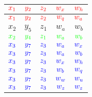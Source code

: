 \documentclass{article}
\begin{document}
{\begin{flushright}
\begin{tabular}{lllll}
	\multicolumn{1}{|c|}{$\textcolor{myred}{x_1}$} & \multicolumn{1}{c|}{$\textcolor{myred}{y_2}$} & \multicolumn{1}{c|}{$\textcolor{myred}{z_2}$} & \multicolumn{1}{c|}{$\textcolor{myred}{w_x}$} & \multicolumn{1}{c|}{$\textcolor{myred}{w_h}$}\\ \hline
    \multicolumn{1}{|c|}{$\textcolor{myred}{x_1}$} & \multicolumn{1}{c|}{$\textcolor{myred}{y_2}$} & \multicolumn{1}{c|}{$\textcolor{myred}{z_2}$} & \multicolumn{1}{c|}{$\textcolor{myred}{w_q}$} & \multicolumn{1}{c|}{$\textcolor{myred}{w_a}$}\\ \hline
    \multicolumn{1}{|c|}{$x_2$} & \multicolumn{1}{c|}{$y_5$} & \multicolumn{1}{c|}{$z_1$} & \multicolumn{1}{c|}{$w_a$} & \multicolumn{1}{c|}{$w_b$}\\ \hline
	\multicolumn{1}{|c|}{$\textcolor{mygreen}{x_2}$} & \multicolumn{1}{c|}{$\textcolor{mygreen}{y_4}$} & \multicolumn{1}{c|}{$\textcolor{mygreen}{z_1}$} & \multicolumn{1}{c|}{$\textcolor{mygreen}{w_a}$} & \multicolumn{1}{c|}{$\textcolor{mygreen}{w_b}$}\\ \hline
    \multicolumn{1}{|c|}{$\textcolor{myblue}{x_3}$} & \multicolumn{1}{c|}{$\textcolor{myblue}{y_7}$} & \multicolumn{1}{c|}{$\textcolor{myblue}{z_3}$} & \multicolumn{1}{c|}{$\textcolor{myblue}{w_a}$} & \multicolumn{1}{c|}{$\textcolor{myblue}{w_x}$}\\ \hline
    \multicolumn{1}{|c|}{$\textcolor{myblue}{x_3}$} & \multicolumn{1}{c|}{$\textcolor{myblue}{y_7}$} & \multicolumn{1}{c|}{$\textcolor{myblue}{z_3}$} & \multicolumn{1}{c|}{$\textcolor{myblue}{w_a}$} & \multicolumn{1}{c|}{$\textcolor{myblue}{w_b}$}\\ \hline
    \multicolumn{1}{|c|}{$\textcolor{myblue}{x_3}$} & \multicolumn{1}{c|}{$\textcolor{myblue}{y_7}$} & \multicolumn{1}{c|}{$\textcolor{myblue}{z_3}$} & \multicolumn{1}{c|}{$\textcolor{myblue}{w_x}$} & \multicolumn{1}{c|}{$\textcolor{myblue}{w_h}$}\\ \hline
    \multicolumn{1}{|c|}{$\textcolor{myblue}{x_3}$} & \multicolumn{1}{c|}{$\textcolor{myblue}{y_7}$} & \multicolumn{1}{c|}{$\textcolor{myblue}{z_3}$} & \multicolumn{1}{c|}{$\textcolor{myblue}{w_b}$} & \multicolumn{1}{c|}{$\textcolor{myblue}{w_q}$}\\ \hline
    \multicolumn{1}{|c|}{$\textcolor{myblue}{x_3}$} & \multicolumn{1}{c|}{$\textcolor{myblue}{y_7}$} & \multicolumn{1}{c|}{$\textcolor{myblue}{z_3}$} & \multicolumn{1}{c|}{$\textcolor{myblue}{w_w}$} & \multicolumn{1}{c|}{$\textcolor{myblue}{w_u}$}\\ \hline
    \multicolumn{1}{|c|}{$\textcolor{myblue}{x_3}$} & \multicolumn{1}{c|}{$\textcolor{myblue}{y_7}$} & \multicolumn{1}{c|}{$\textcolor{myblue}{z_3}$} & \multicolumn{1}{c|}{$\textcolor{myblue}{w_z}$} & \multicolumn{1}{c|}{$\textcolor{myblue}{w_z}$}\\ \hline

\end{tabular}
\end{flushright}}
\end{document}
